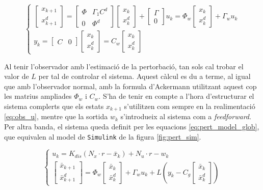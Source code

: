 \documentclass[12pt,a4paper,final,twoside,openright]{report}
\begin{document}
\begin{equation}\label{eq:pert_model_mat}
\left\{
\begin{array}{lr}
\begin{bmatrix}
x_{k+1}\\
x^d_{k+1}
\end{bmatrix} = 
\begin{bmatrix}
\Phi & \Gamma_1 C^d\\
0 & \Phi^d
\end{bmatrix} \begin{bmatrix}
x_{k}\\
x^d_{k}
\end{bmatrix} + 
\begin{bmatrix}
\Gamma\\
0
\end{bmatrix} u_k = \Phi_w \begin{bmatrix}
x_{k}\\
x^d_{k}
\end{bmatrix} + \Gamma_w u_k\\
y_k=\begin{bmatrix}
C & 0
\end{bmatrix} \begin{bmatrix}
x_{k}\\
x^d_{k}
\end{bmatrix} = C_w \begin{bmatrix}
x_{k}\\
x^d_{k}
\end{bmatrix}
\end{array}
\right.
\end{equation}

Al tenir l'observador amb l'estimació de la pertorbació, tan sols cal trobar el valor de $L$ per tal de controlar el sistema. Aquest càlcul es du a terme, al igual que amb l'observador normal, amb la formula d'Ackermann utilitzant aquest cop les matrius ampliades $\Phi_w$ i $C_w$. S'ha de tenir en compte a l'hora d'estructurar el sistema complerts que els estats $x_{k+1}$ s'utilitzen com sempre en la realimentació \eqref{eq:obs_u}, mentre que la sortida $w_k$ s'introdueix al sistema com a \textit{feedforward}. Per altra banda, el sistema queda definit per les equacions \eqref{eq:pert_model_glob}, que equivalen al model de \texttt{Simulink} de la figura \ref{fig:pert_sim}.

\begin{equation}\label{eq:pert_model_glob}
\left\{
\begin{array}{lr}
u_k=K_{dis} (N_x \cdot r - \bar{x}_{k}) + N_u \cdot r - w_k\\
\begin{bmatrix}
\bar{x}_{k+1}\\
\bar{x}^d_{k+1}
\end{bmatrix} = \Phi_w \begin{bmatrix}
\bar{x}_{k}\\
\bar{x}^d_{k}
\end{bmatrix} + \Gamma_w u_k + L (y_k - C_g \begin{bmatrix}
\bar{x}_{k}\\
\bar{x}^d_{k}
\end{bmatrix})
\end{array}
\right.
\end{equation} 
\end{document}
